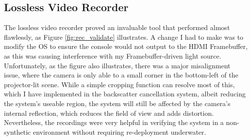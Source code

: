 \subsection{Lossless Video Recorder}
The lossless video recorder proved an invaluable tool that performed almost flawlessly, as Figure \ref{fig:rec_validate} illustrates. A change I had to make was to modify the OS to ensure the console would not output to the HDMI Framebuffer, as this was causing interference with my Framebuffer-driven light source. Unfortunately, as the figure also illustrates, there was a major misalignment issue, where the camera is only able to a small corner in the bottom-left of the projector-lit scene. While a simple cropping function can resolve most of this, which I have implemented in the backscatter cancellation system, albeit reducing the system's useable region, the system will still be affected by the camera's internal reflection, which reduces the field of view and adds distortion. Nevertheless, the recordings were very helpful in verifying the system in a non-synthetic environment without requiring re-deployment underwater.


